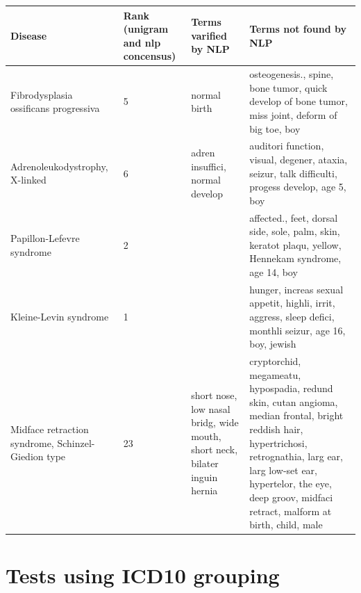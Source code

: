 \documentclass[10pt,letterpaper,final]{article}
\begin{document}
\begin{center}
\begin{small}
	\begin{longtable}{|p{3.5cm}|p{1.5cm}|p{3cm}|p{3cm}|}
	\hline
	\textbf{Disease}  & \textbf{Rank (unigram and nlp concensus)} & \textbf{Terms varified by NLP}  & \textbf{Terms not found by NLP} \\
	\hline\hline
Fibrodysplasia ossificans progressiva & 5 & normal birth & osteogenesis., spine, bone tumor, quick develop of bone tumor, miss joint, deform of big toe, boy \\ \hline
Adrenoleukodystrophy, X-linked & 6 & adren insuffici, normal develop & auditori function, visual, degener, ataxia, seizur, talk difficulti, progess develop, age 5, boy \\ \hline
Papillon-Lefevre syndrome & 2 &  & affected., feet, dorsal side, sole, palm, skin, keratot plaqu, yellow, Hennekam syndrome, age 14, boy \\ \hline
Kleine-Levin syndrome & 1 &  & hunger, increas sexual appetit, highli, irrit, aggress, sleep defici, monthli seizur, age 16, boy, jewish \\ \hline
Midface retraction syndrome, Schinzel-Giedion type & 23 & short nose, low nasal bridg, wide mouth, short neck, bilater inguin hernia & cryptorchid, megameatu, hypospadia, redund skin, cutan angioma, median frontal, bright reddish hair, hypertrichosi, retrognathia, larg ear, larg low-set ear, hypertelor, the eye, deep groov, midfaci retract, malform at birth, child, male \\ \hline
	\end{longtable}
\end{small}
\end{center}




\newpage
\section{Tests using ICD10 grouping}
\end{document}
